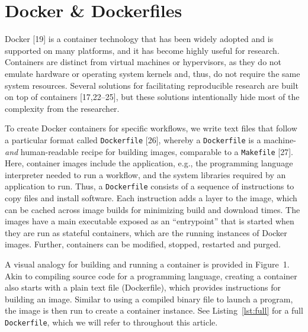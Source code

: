 \documentclass[10pt,letterpaper]{article}
\begin{document}
\hypertarget{docker-dockerfiles}{%
\section{Docker \& Dockerfiles}\label{docker-dockerfiles}}

Docker {[}19{]} is a container technology that has been widely adopted
and is supported on many platforms, and it has become highly useful for
research. Containers are distinct from virtual machines or hypervisors,
as they do not emulate hardware or operating system kernels and, thus,
do not require the same system resources. Several solutions for
facilitating reproducible research are built on top of containers
{[}17,22--25{]}, but these solutions intentionally hide most of the
complexity from the researcher.

To create Docker containers for specific workflows, we write text files
that follow a particular format called \texttt{Dockerfile} {[}26{]},
whereby a \texttt{Dockerfile} is a machine- \emph{and} human-readable
recipe for building images, comparable to a \texttt{Makefile} {[}27{]}.
Here, container images include the application, e.g., the programming
language interpreter needed to run a workflow, and the system libraries
required by an application to run. Thus, a \texttt{Dockerfile} consists
of a sequence of instructions to copy files and install software. Each
instruction adds a layer to the image, which can be cached across image
builds for minimizing build and download times. The images have a main
executable exposed as an ``entrypoint'' that is started when they are
run as stateful containers, which are the running instances of Docker
images. Further, containers can be modified, stopped, restarted and
purged.

A visual analogy for building and running a container is provided in
Figure~1. Akin to compiling source code for a programming language,
creating a container also starts with a plain text file (Dockerfile),
which provides instructions for building an image. Similar to using a
compiled binary file to launch a program, the image is then run to
create a container instance. See Listing~\ref{lst:full} for a full
\texttt{Dockerfile}, which we will refer to throughout this article.
\end{document}
